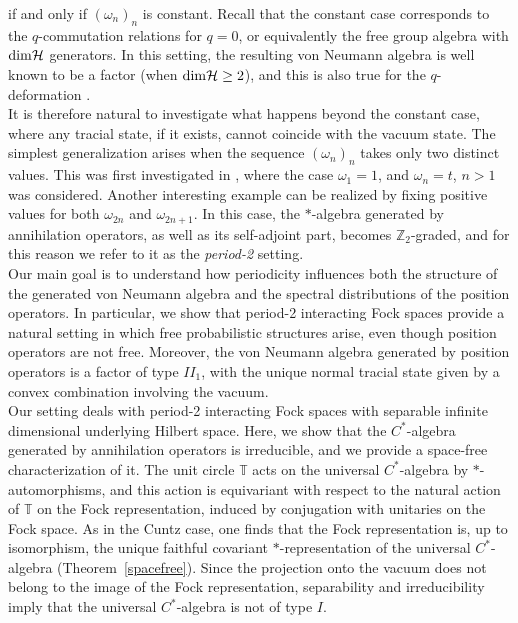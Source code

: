 \documentclass[12pt]{amsart}
\numberwithin{equation}{section}
\theoremstyle{definition}
\begin{document}
if and only if $(\omega_n)_n$ is constant.
Recall that the constant case corresponds to the $q$-commutation
relations \cite{BS,BKS} for $q = 0$, or equivalently the free group algebra with ${\rm dim} \mathcal H$ generators. In this setting, the
  resulting von Neumann algebra is well known to be a factor (when ${\rm dim} \mathcal H\geq 2$), and this is also true for the $q$-deformation \cite{R}.\\
  It is therefore natural to investigate what happens beyond the
constant case, where any tracial state, if it exists, cannot coincide
with the vacuum state. The simplest generalization arises when the
sequence $(\omega_n)_n$ takes only two distinct values. This was first investigated in \cite{R2}, where the case
  $\omega_1=1$, and $\omega_n=t$, $n>1$ was considered. Another interesting example can be realized by fixing positive values for both $\omega_{2n}$ and $\omega_{2n+1}$. In this case, the $*$-algebra generated by annihilation operators, as well as its self-adjoint part, becomes $\mathbb{Z}_2$-graded, and for this reason we refer to it as the \emph{period-2} setting.\\
Our main goal is to understand how periodicity influences both the structure of the generated von Neumann algebra and the spectral distributions of the position operators. In particular, we show that period-2 interacting Fock spaces provide a natural setting in which free probabilistic structures arise, even though position operators are not free. Moreover, the von Neumann algebra generated by position operators is a factor of type $II_1$, with the unique normal tracial state given by a convex combination involving the vacuum.\\
Our setting  deals with period-2 interacting Fock spaces with separable infinite dimensional underlying Hilbert space. Here, we show that the $C^*$-algebra generated by annihilation operators is irreducible, and we provide a space-free characterization of it. The unit circle $\mathbb{T}$ acts on the universal $C^*$-algebra by $*$-automorphisms, and this action is equivariant with respect to the natural action of $\mathbb{T}$ on the Fock representation, induced by conjugation with unitaries on the Fock space. As in the Cuntz case, one finds that the Fock representation is, up to isomorphism, the unique faithful covariant $*$-representation of the universal $C^*$-algebra (Theorem~\ref{spacefree}). Since the projection onto the vacuum does not belong to the image of the Fock representation, separability and irreducibility imply that the universal $C^*$-algebra is not of type $I$.\\
\end{document}
